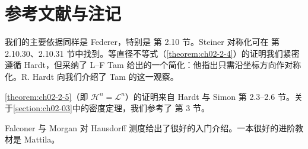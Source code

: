 \documentclass[../../main.tex]{subfiles}%
\begin{document}
\section{参考文献与注记}\label{section:ch02-05}

我们的主要依据同样是 Federer\cite{federer1969}，特别是\cite{federer1969} 第 2.10 节。Steiner 对称化可在\cite{federer1969} 第 2.10.30、2.10.31 节中找到。等直径不等式（\cref{theorem:ch02-2-4}）的证明我们紧密遵循 Hardt\cite{hardt1979}，但采纳了 L--F Tam 给出的一个简化：他指出只需沿坐标方向作对称化。R. Hardt 向我们介绍了 Tam 的这一观察。%

\cref{theorem:ch02-2-5}（即 $\mathcal{H}^n=\mathcal{L}^n$）的证明来自 Hardt\cite{hardt1979} 与 Simon\cite{simon1984} 第 2.3--2.6 节。关于\cref{section:ch02-03}中的密度定理，我们参考了\cite{simon1984} 第 3 节。%

Falconer\cite{falconer1985,falconer1990} 与 Morgan\cite{morgan2009} 对 Hausdorff 测度给出了很好的入门介绍。一本很好的进阶教材是 Mattila\cite{mattila1995}。
\end{document}

